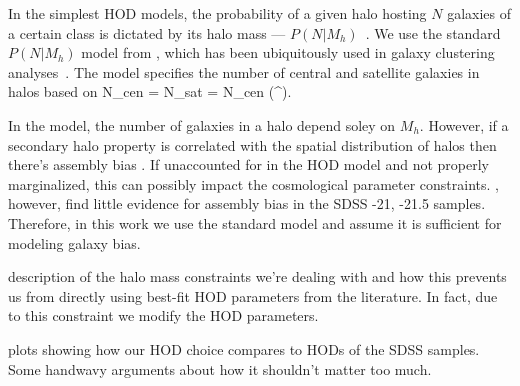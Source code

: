 In the simplest HOD models, the probability of a given halo hosting $N$ galaxies 
of a certain class is dictated by its halo mass --- $P(N|M_h)$~\citep[\emph{e.g.}][]{zheng2007}. 
We use the standard $P(N|M_h)$ model from \cite{zheng2007}, which has been 
ubiquitously used in galaxy clustering analyses~\citep[\emph{e.g.}][]{citecite}. 
The model specifies the number of central and satellite galaxies in halos based 
on 
\beq
\langle N_{\rm cen} \rangle  = 
\eeq
\beq
\langle N_{\rm sat} \rangle = \langle N_{\rm cen} \rangle \bigg(^\alpha \bigg).
\eeq
{}

In the \cite{zheng2007} model, the number of galaxies in a halo depend soley on $M_h$. 
However, if a secondary halo property is correlated with the spatial distribution of 
halos then there's assembly bias . 
If unaccounted for in the HOD model and not properly marginalized, this can possibly 
impact the cosmological parameter constraints. \cite{vakli2019}, however, find little 
evidence for assembly bias in the SDSS -21, -21.5 samples. Therefore, in this work
we use the standard \cite{zheng2007} model and assume it is sufficient for modeling 
galaxy bias. 

\bitem
\item description of the halo mass constraints we're dealing with and how this prevents 
    us from directly using best-fit HOD parameters from the literature. In fact, due
    to this constraint we modify the HOD parameters.
\item plots showing how our HOD choice compares to HODs of the SDSS samples. Some handwavy
    arguments about how it shouldn't matter too much. 
\eitem
